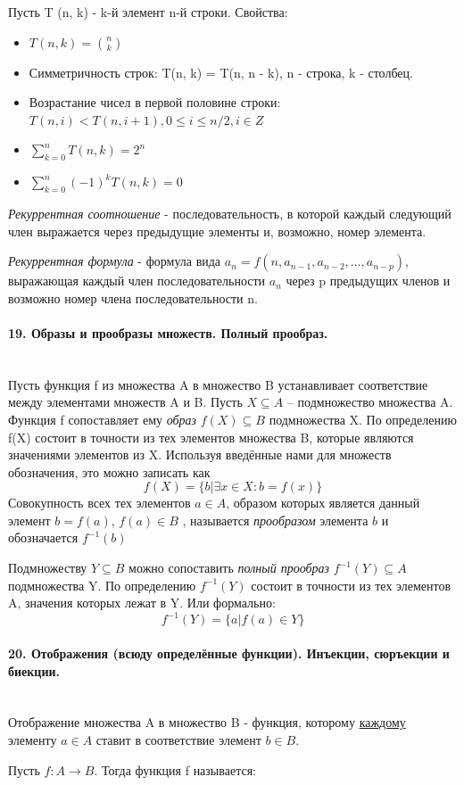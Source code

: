 \documentclass[a4paper, 12pt]{article}
\newcommand{\parag}[1]{\paragraph{#1}\mbox{}\\}
\begin{document}
Пусть T (n, k) - k-й элемент n-й строки. Свойства:
\begin{itemize}
    \item $T(n, k) = {n \choose k}$
    \item Симметричность строк: T(n, k) = T(n, n - k), n - строка, k - столбец.
    \item Возрастание чисел в первой половине строки: $T(n, i) < T (n, i + 1), 0 \leqslant i \leqslant n/2, i \in Z$
    \item $\sum_{k=0}^{n} T(n, k) = 2^n$
    \item $\sum_{k=0}^{n} (-1)^k T(n, k) = 0$
\end{itemize}

\noindent
\textit{Рекуррентная соотношение} - последовательность, в которой каждый следующий член выражается через предыдущие элементы и, возможно, номер элемента.

\noindent
\textit{Рекуррентная формула} - формула вида $a_{n}=f(n,a_{n-1},a_{n-2},\dots ,a_{n-p})$, выражающая каждый член последовательности $a_{n}$ через p предыдущих членов и возможно номер члена последовательности n.

\parag{19. Образы и прообразы множеств. Полный прообраз.}
Пусть функция f из множества A в множество B устанавливает соответствие между элементами множеств A и B. Пусть $X \subseteq A$ – подмножество множества A. Функция f сопоставляет ему \textit{образ} $f(X) \subseteq B$ подмножества X. По определению f(X) состоит в точности из тех
элементов множества B, которые являются значениями элементов из X. Используя введённые нами для множеств обозначения, это можно записать как
\[
    f(X) = \{ b | \exists x \in X: b = f(x) \}
\]
Совокупность всех тех элементов $a \in A$, образом которых является данный элемент $b = f(a)$, $f(a) \in B$ , называется \textit{прообразом} элемента $b$ и обозначается $f^{-1}(b)$

\noindent
Подмножеству $Y \subseteq B$ можно сопоставить \textit{полный прообраз} $f^{-1}(Y) \subseteq A $ подмножества Y. По определению $f^{-1}(Y)$ состоит в точности из тех элементов A, значения которых лежат в Y. Или формально:
\[
    f^{-1}(Y) = \{a | f(a) \in Y\}
\]

\parag{20. Отображения (всюду определённые функции). Инъекции, сюръекции и биекции.}
Отображение множества A в множество B - функция, которому \underline{каждому} элементу $a \in A$ ставит в соответствие элемент $b \in B$.

\noindent
Пусть $f: A \to B$. Тогда функция f называется:
\end{document}
